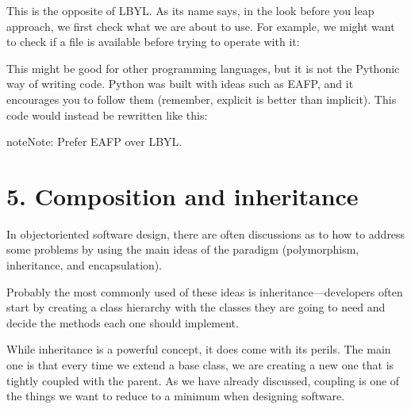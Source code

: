 \documentclass[a4paper,10pt,english]{sphinxmanual}
\begin{document}
This is the opposite of LBYL. As its name says, in the look before you leap approach, we first check what we
are about to use. For example, we might want to check if a file is available before trying to operate with it:

\begin{sphinxVerbatim}[commandchars=\\\{\}]
 
       
\end{sphinxVerbatim}

This might be good for other programming languages, but it is not the Pythonic way of writing code. Python was
built with ideas such as EAFP, and it encourages you to follow them (remember, explicit is better than
implicit). This code would instead be rewritten like this:

\begin{sphinxVerbatim}[commandchars=\\\{\}]
   
   
\end{sphinxVerbatim}

\begin{sphinxadmonition}{note}{Note:}
Prefer EAFP over LBYL.
\end{sphinxadmonition}


\section{5. Composition and inheritance}
\label{\detokenize{chapters/3_general_traits/index:composition-and-inheritance}}
In object\sphinxhyphen{}oriented software design, there are often discussions as to how to address some problems by using
the main ideas of the paradigm (polymorphism, inheritance, and encapsulation).

Probably the most commonly used of these ideas is inheritance—developers often start by creating a class
hierarchy with the classes they are going to need and decide the methods each one should implement.

While inheritance is a powerful concept, it does come with its perils. The main one is that every time we
extend a base class, we are creating a new one that is tightly coupled with the parent. As we have already
discussed, coupling is one of the things we want to reduce to a minimum when designing software.
\end{document}
